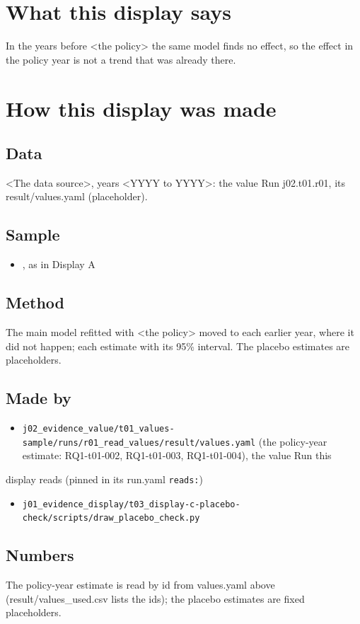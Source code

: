 \documentclass[12pt]{article}
\begin{document}
\makeatletter\renewcommand{\fps@figure}{H}\renewcommand{\fps@table}{H}\makeatother
\renewcommand{\figurename}{eFigure}\renewcommand{\tablename}{eTable}\renewcommand{\thefigure}{1}\renewcommand{\thetable}{1}
{}
\clearpage
\section*{What this display says}
In the years before <the policy> the same model finds no effect, so the effect in the policy year is not a trend that was already there.

\section*{How this display was made}
\subsection*{Data}
<The data source>, years <YYYY to YYYY>: the value Run j02.t01.r01, its result/values.yaml (placeholder).

\subsection*{Sample}
\begin{itemize}\item <who is in it>, as in Display A
\end{itemize}
\subsection*{Method}
The main model refitted with <the policy> moved to each earlier year, where it did not happen; each estimate with its 95\% interval. The placebo estimates are placeholders.

\subsection*{Made by}
\begin{itemize}\item \texttt{j02\_evidence\_value/t01\_values-sample/runs/r01\_read\_values/result/values.yaml} (the policy-year estimate: RQ1-t01-002, RQ1-t01-003, RQ1-t01-004), the value Run this
\end{itemize}
display reads (pinned in its run.yaml \texttt{reads:})

\begin{itemize}\item \texttt{j01\_evidence\_display/t03\_display-c-placebo-check/scripts/draw\_placebo\_check.py}
\end{itemize}
\subsection*{Numbers}
The policy-year estimate is read by id from values.yaml above (result/values\_used.csv lists the ids); the placebo estimates are fixed placeholders.
\end{document}
